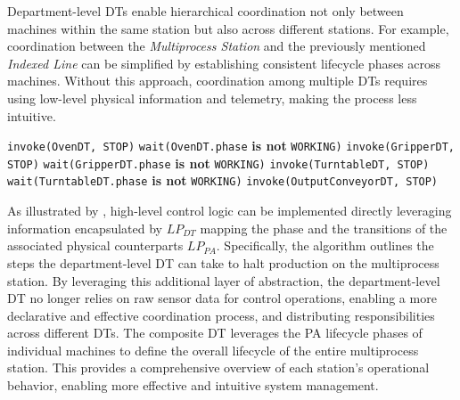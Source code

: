 Department-level \acp{DT} enable hierarchical coordination not only between machines within the same station but also across different stations.
%
For example, coordination between the \textit{Multiprocess Station} and the previously mentioned \textit{Indexed Line} can be simplified by establishing consistent lifecycle phases across machines.
%
Without this approach, coordination among multiple DTs requires using low-level physical information and telemetry, making the process less intuitive.

\begin{algorithm}
\caption{Multiple DTs Stopping Procedure}
\begin{algorithmic}
\State \texttt{invoke(OvenDT, STOP)}
    \State \texttt{wait(OvenDT.phase} \textbf{is not} \texttt{WORKING)}
\EndWhile
\State \texttt{invoke(GripperDT, STOP)}
    \State \texttt{wait(GripperDT.phase} \textbf{is not} \texttt{WORKING)}
\EndWhile
\State \texttt{invoke(TurntableDT, STOP)}
    \State \texttt{wait(TurntableDT.phase} \textbf{is not} \texttt{WORKING)}
\EndWhile
\State \texttt{invoke(OutputConveyorDT, STOP)}
\end{algorithmic}
\label{code:soft-stop-logic}
\end{algorithm}

As illustrated by , high-level control logic can be implemented directly leveraging information encapsulated by $LP_{DT}$ mapping the phase and the transitions of the associated physical counterparts $LP_{PA}$. Specifically, the algorithm outlines the steps the department-level DT can take to halt production on the multiprocess station.
By leveraging this additional layer of abstraction, the department-level DT no longer relies on raw sensor data for control operations, enabling a more declarative and effective coordination process, and distributing responsibilities across different DTs.
%
The composite DT leverages the PA lifecycle phases of individual machines to define the overall lifecycle of the entire multiprocess station. This provides a comprehensive overview of each station's operational behavior, enabling more effective and intuitive system management.


